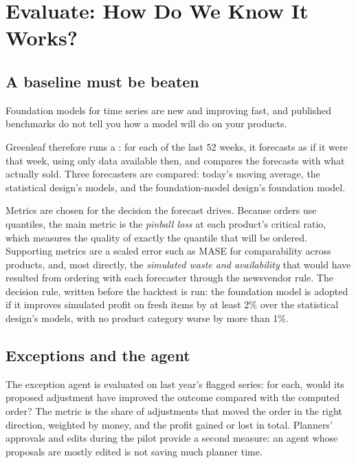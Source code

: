 \section{Evaluate: How Do We Know It Works?}
\label{sec:fc-evaluate}

\subsection{A baseline must be beaten}

\begin{watchout}
Foundation models for time series are new and improving fast, and published benchmarks do not tell you how a model will do on your products.
\end{watchout} Greenleaf therefore runs a : for each of the last 52 weeks, it forecasts as if it were that week, using only data available then, and compares the forecasts with what actually sold. Three forecasters are compared: today's moving average, the statistical design's models, and the foundation-model design's foundation model.

Metrics are chosen for the decision the forecast drives. Because orders use quantiles, the main metric is the \emph{pinball loss} at each product's critical ratio, which measures the quality of exactly the quantile that will be ordered. Supporting metrics are a scaled error such as MASE for comparability across products, and, most directly, the \emph{simulated waste and availability} that would have resulted from ordering with each forecaster through the newsvendor rule. The decision rule, written before the backtest is run: the foundation model is adopted if it improves simulated profit on fresh items by at least 2\% over the statistical design's models, with no product category worse by more than 1\%.

\subsection{Exceptions and the agent}

The exception agent is evaluated on last year's flagged series: for each, would its proposed adjustment have improved the outcome compared with the computed order? The metric is the share of adjustments that moved the order in the right direction, weighted by money, and the profit gained or lost in total. Planners' approvals and edits during the pilot provide a second measure: an agent whose proposals are mostly edited is not saving much planner time.

